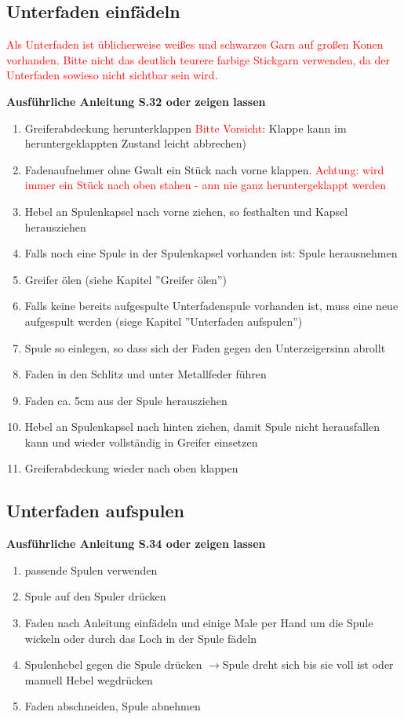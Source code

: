 \documentclass{\basedir/fablab-document}
\newcommand{\pfeil}{\ensuremath{\rightarrow}}
\begin{document}
\vspace{2em}

\subsection{Unterfaden einfädeln}
\textcolor{red}{Als Unterfaden ist üblicherweise weißes und schwarzes Garn auf großen Konen vorhanden. Bitte nicht das deutlich teurere farbige Stickgarn verwenden, da der Unterfaden sowieso nicht sichtbar sein wird.}

\vspace{1em}
\textbf{Ausführliche Anleitung S.32 oder zeigen lassen}
\begin{enumerate}
	\item Greiferabdeckung herunterklappen \textcolor{red}{Bitte Vorsicht}: Klappe kann im heruntergeklappten Zustand leicht abbrechen)
	\item Fadenaufnehmer ohne Gwalt ein Stück nach vorne klappen. \textcolor{red}{Achtung: wird immer ein Stück nach oben stahen - ann nie ganz heruntergeklappt werden}
	\item Hebel an Spulenkapsel nach vorne ziehen, so festhalten und Kapsel herausziehen 
	\item Falls noch eine Spule in der Spulenkapsel vorhanden ist: Spule herausnehmen
	\item Greifer ölen (siehe Kapitel ''Greifer ölen'')
	\item Falls keine bereits aufgespulte Unterfadenspule vorhanden ist, muss eine neue aufgespult werden (siege Kapitel ''Unterfaden aufspulen'')
	\item Spule so einlegen, so dass sich der Faden gegen den Unterzeigersinn abrollt
	\item Faden in den Schlitz und unter Metallfeder führen
	\item Faden ca. 5cm aus der Spule herausziehen
	\item Hebel an Spulenkapsel nach hinten ziehen, damit Spule nicht herausfallen kann und wieder vollständig in Greifer einsetzen
	\item Greiferabdeckung wieder nach oben klappen
\end{enumerate}

\subsection{Unterfaden aufspulen}
\textbf{Ausführliche Anleitung S.34 oder zeigen lassen}
\begin{enumerate}
	\item passende Spulen verwenden
	\item Spule auf den Spuler drücken
	\item Faden nach Anleitung einfädeln und einige Male per Hand um die Spule wickeln oder durch das Loch in der Spule fädeln
	\item Spulenhebel gegen die Spule drücken \pfeil Spule dreht sich bis sie voll ist oder manuell Hebel wegdrücken
	\item Faden abschneiden, Spule abnehmen
\end{enumerate}
\end{document}
